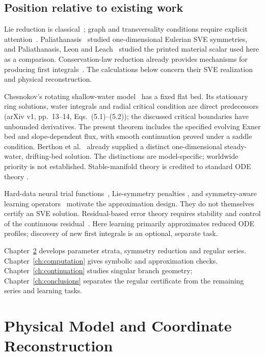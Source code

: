 \documentclass[12pt,a4paper,oneside]{report}
\numberwithin{equation}{chapter}
\theoremstyle{remark}\newtheorem{remark}[theorem]{Remark}
\begin{document}
\section{Position relative to existing work}
Lie reduction is classical~\cite[Ch.~3]{olver}; graph and transversality
conditions require explicit attention~\cite{anderson2000}. Paliathanasis~\cite{sve2022} studied
one-dimensional Eulerian SVE symmetries, and Paliathanasis, Leon and
Leach~\cite{ap} studied the printed material scalar used here as a comparison.
Conservation-law reduction already provides mechanisms for producing first
integrals~\cite[\S2.5, Theorem~1]{druzhkov2024}. The calculations below concern
their SVE realization and physical reconstruction.

Chesnokov's rotating shallow-water model~\cite{chesnokov} has a fixed flat bed.
Its stationary ring solutions, water integrals and radial critical condition
are direct predecessors (arXiv v1, pp.~13--14, Eqs.~(5.1)--(5.2)); the discussed
critical boundaries have unbounded derivatives. The present theorem includes
the specified evolving Exner bed and slope-dependent flux, with smooth
continuation proved under a saddle condition. Berthon et al.~\cite{berthon2012}
already supplied a distinct one-dimensional steady-water, drifting-bed
solution. The distinctions are model-specific; worldwide priority is not
established. Stable-manifold theory is credited to standard ODE theory
\cite{teschl2012}.

Hard-data neural trial functions~\cite{lagaris}, Lie-symmetry penalties
\cite{sympinn}, and symmetry-aware learning operators~\cite{otto} motivate
the approximation design. They do not themselves certify an SVE solution.
Residual-based error theory requires stability and control of the continuous
residual~\cite{mishra2023}. Here learning primarily approximates reduced ODE
profiles; discovery of new first integrals is an optional, separate task.

Chapter~\ref{ch:models} develops parameter strata, symmetry reduction and
regular series. Chapter~\ref{ch:computation} gives symbolic and approximation
checks. Chapter~\ref{ch:continuation} studies singular branch geometry;
Chapter~\ref{ch:conclusions} separates the regular certificate from the
remaining series and learning tasks.


\chapter{Physical Model and Coordinate Reconstruction}\label{ch:models}
\end{document}
